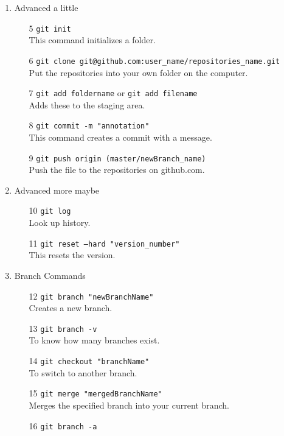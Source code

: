 \documentclass{article}
\begin{document}
\begin{enumerate}
    \item Advanced a little  
    \begin{itemize}  
        \item[5] \texttt{git init} \\
        This command initializes a folder.  
        \item[6] \texttt{git clone git@github.com:user\_name/repositories\_name.git} \\
        Put the repositories into your own folder on the computer.  
        \item[7] \texttt{git add foldername} or \texttt{git add filename} \\
        Adds these to the staging area.  
        \item[8] \texttt{git commit -m "annotation"} \\
        This command creates a commit with a message.  
        \item[9] \texttt{git push origin (master/newBranch\_name)} \\
        Push the file to the repositories on github.com.  
    \end{itemize}  
    \item Advanced more maybe  
    \begin{itemize}  
        \item[10] \texttt{git log} \\
        Look up history.  
        \item[11] \texttt{git reset --hard "version\_number"} \\
        This resets the version.  
    \end{itemize}  
    \item Branch Commands  
    \begin{itemize}  
        \item[12] \texttt{git branch "newBranchName"} \\
        Creates a new branch.  
        \item[13] \texttt{git branch -v} \\
        To know how many branches exist.  
        \item[14] \texttt{git checkout "branchName"} \\
        To switch to another branch.  
        \item[15] \texttt{git merge "mergedBranchName"} \\
        Merges the specified branch into your current branch.  
        \item[16] \texttt{git branch -a} \\

\end{itemize}
\end{enumerate}
\end{document}
